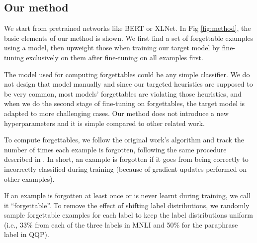 \subsection{Our method}
We start from pretrained networks like BERT or XLNet.
In Fig \ref{fig:method}, the basic elements of our method is 
shown. 
We first find a set of forgettable examples using a model, 
then upweight those when training our target model by fine-tuning 
exclusively on them after fine-tuning on all examples first.

The model used for computing forgettables could be any  
simple classifier.
We do not design that model manually and since our targeted heuristics are supposed to be very common, most models' forgettables are violating those heuristics, and when we do the second stage of fine-tuning on forgettables, the target model is adapted to more challenging cases. 
Our method does not introduce a new hyperparameters and it is 
simple compared to other related work. 

To compute forgettables, we follow the original work's algorithm \cite{toneva2018empirical}
 and track the number of times each example is forgotten, following the same procedure described in \citet{toneva2018empirical}. In short, an example is forgotten if it goes from being correctly to incorrectly classified during training (because of gradient updates performed on other examples). 

If an example is forgotten at least once or is never learnt during training, we call it ``forgettable''. 
To remove the effect of shifting label distributions, we randomly sample forgettable examples for each label to keep the label distributions uniform
(i.e., 33\% from each of the three labels in MNLI and 50\% for the paraphrase label in QQP). 


